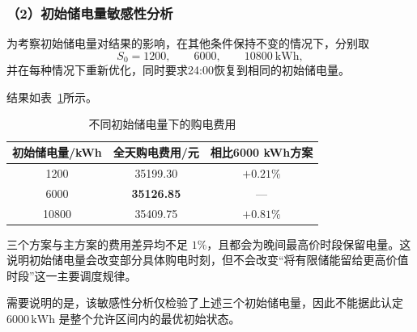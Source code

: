 \subsubsection*{（2）初始储电量敏感性分析}

为考察初始储电量对结果的影响，在其他条件保持不变的情况下，分别取
\[
S_0=1200,\qquad 6000,\qquad 10800\ \mathrm{kWh},
\]
并在每种情况下重新优化，同时要求24:00恢复到相同的初始储电量。

结果如表~\ref{tab:q1_sensitivity}所示。

\begin{table}[H]
    \centering
    \caption{不同初始储电量下的购电费用}
    \label{tab:q1_sensitivity}
    \begin{tabular}{ccc}
        \toprule
        初始储电量/kWh & 全天购电费用/元 & 相比6000 kWh方案 \\
        \midrule
        1200 & 35199.30 & $+0.21\%$ \\
        6000 & \textbf{35126.85} & --- \\
        10800 & 35409.75 & $+0.81\%$ \\
        \bottomrule
    \end{tabular}
\end{table}

三个方案与主方案的费用差异均不足 \(1\%\)，且都会为晚间最高价时段保留电量。这说明初始储电量会改变部分具体购电时刻，但不会改变“将有限储能留给更高价值时段”这一主要调度规律。

需要说明的是，该敏感性分析仅检验了上述三个初始储电量，因此不能据此认定 \(6000\,\mathrm{kWh}\) 是整个允许区间内的最优初始状态。
